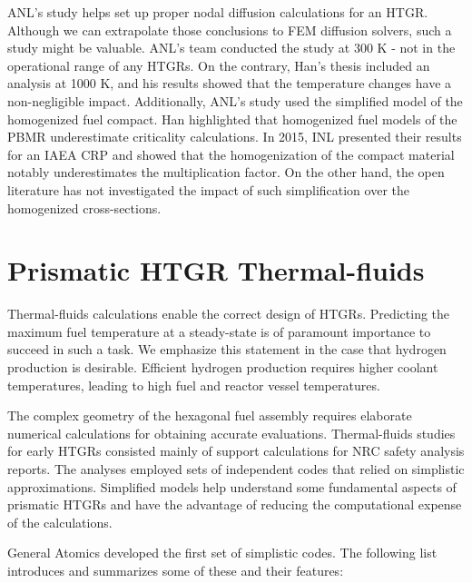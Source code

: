 ANL's study helps set up proper nodal diffusion calculations for an \gls{HTGR}.
Although we can extrapolate those conclusions to \gls{FEM} diffusion solvers, such a study might be valuable.
ANL's team conducted the study at 300 K - not in the operational range of any \glspl{HTGR}.
On the contrary, Han's thesis included an analysis at 1000 K, and his results showed that the temperature changes have a non-negligible impact.
Additionally, ANL's study used the simplified model of the homogenized fuel compact.
Han highlighted that homogenized fuel models of the \gls{PBMR} underestimate criticality calculations.
In 2015, \gls{INL} presented their results \cite{strydom_results_2015} for an \gls{IAEA} \gls{CRP} \cite{tyobeka_htgr_2011} and showed that the homogenization of the compact material notably underestimates the multiplication factor.
On the other hand, the open literature has not investigated the impact of such simplification over the homogenized cross-sections.

\section{Prismatic HTGR Thermal-fluids}
\label{sec:litrev-thermalf}

Thermal-fluids calculations enable the correct design of \glspl{HTGR}.
Predicting the maximum fuel temperature at a steady-state is of paramount importance to succeed in such a task.
We emphasize this statement in the case that hydrogen production is desirable.
Efficient hydrogen production requires higher coolant temperatures, leading to high fuel and reactor vessel temperatures.

The complex geometry of the hexagonal fuel assembly requires elaborate numerical calculations for obtaining accurate evaluations.
Thermal-fluids studies for early \glspl{HTGR} consisted mainly of support calculations for \gls{NRC} safety analysis reports.
The analyses employed sets of independent codes that relied on simplistic approximations.
Simplified models help understand some fundamental aspects of prismatic \glspl{HTGR} and have the advantage of reducing the computational expense of the calculations.

General Atomics \cite{shenoy_htgr_1974} developed the first set of simplistic codes.
The following list introduces and summarizes some of these and their features:

